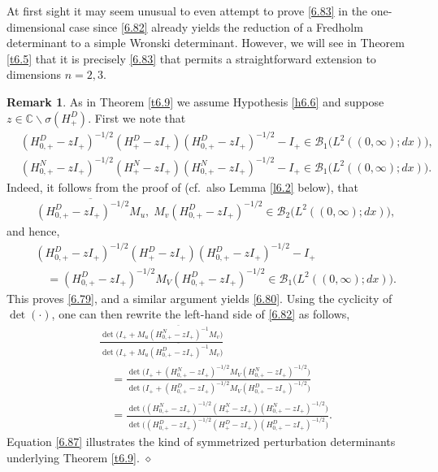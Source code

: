 \documentclass[reqno,10pt, centertags]{amsart}
\newcommand{\bbC}{{\mathbb{C}}}
\newcommand{\cB}{{\mathcal B}}
\newcommand{\no}{\nonumber}
\newcommand{\lb}{\label}
\newcommand{\ol}{\overline}
\newcommand{\si}{\sigma}
\numberwithin{equation}{section}
\theoremstyle{definition}
\newtheorem{remark}[theorem]{Remark}
\begin{document}
At first sight it may seem unusual to even attempt to prove \eqref{6.83}
in the one-dimensional case since \eqref{6.82} already yields the
reduction of a Fredholm determinant to a simple Wronski determinant.
However, we will see in Theorem \ref{t6.5} that it is precisely
\eqref{6.83} that permits a straightforward extension to dimensions
$n=2,3$.

\begin{remark} \lb{r6.5}
As in Theorem \ref{t6.9} we assume Hypothesis \ref{h6.6} and suppose
$z\in\bbC\backslash\si(H_+^D)$. First we note
that
\begin{align}
&(H_{0,+}^D-zI_+)^{-1/2}(H_+^D-zI_+)(H_{0,+}^D-zI_+)^{-1/2} - I_+
\in\cB_1\big(L^2((0,\infty);dx)\big), \lb{6.79} \\
&(H_{0,+}^N-zI_+)^{-1/2}(H_+^N-zI_+)(H_{0,+}^N-zI_+)^{-1/2} - I_+
\in\cB_1\big(L^2((0,\infty);dx)\big). \lb{6.80}
\end{align}
Indeed, it follows from the proof of
\cite[Theorem 4.2]{GM03} (cf.\ also Lemma \ref{l6.2} below), that
\begin{align}
& \ol{(H_{0,+}^D-z I_+)^{-1/2}M_u}, \; M_v(H_{0,+}^D-z I_+)^{-1/2} \in
\cB_2\big(L^2((0,\infty);dx)\big),
\end{align}
and hence,
\begin{align}
&(H_{0,+}^D-zI_+)^{-1/2}(H_+^D-z I_+)(H_{0,+}^D-z I_+)^{-1/2} - I_+
\\
&\quad = (H_{0,+}^D-zI_+)^{-1/2}M_V(H_{0,+}^D-zI_+)^{-1/2}
\in\cB_1\big(L^2((0,\infty);dx)\big).
\end{align}
This proves \eqref{6.79}, and a similar argument yields \eqref{6.80}.
Using the cyclicity of $\det(\cdot)$, one can then rewrite the left-hand
side of \eqref{6.82} as follows,
\begin{align}
& \frac{\det\big(I_+ +\ol{M_u(H_{0, +}^N-z I_+)^{-1} M_v}\big)}
{\det\big(I_+ +\ol{M_u(H_{0, +}^D-z I_+)^{-1}M_v}\big)} \no \\
&\quad = \frac{\det\big(
I_++(H_{0,+}^N-zI_+)^{-1/2}M_V(H_{0,+}^N-zI_+)^{-1/2} \big)}
{\det\big(I_++(H_{0,+}^D-zI_+)^{-1/2}M_V(H_{0,+}^D-zI_+)^{-1/2}\big)}
\no
\\
& \quad =\frac{\det\big(
(H_{0,+}^N-zI_+)^{-1/2}(H_+^N-zI_+)(H_{0,+}^N-zI_+)^{-1/2} \big)}
{\det\big( (H_{0,+}^D-zI_+)^{-1/2}(H_+^D-zI_+)(H_{0,+}^D-zI_+)^{-1/2}
\big)}.  \lb{6.87}
\end{align}
Equation \eqref{6.87} illustrates the kind of symmetrized
perturbation determinants underlying Theorem \ref{t6.9}. 
\hfill $\diamond$
\end{remark}
\end{document}
